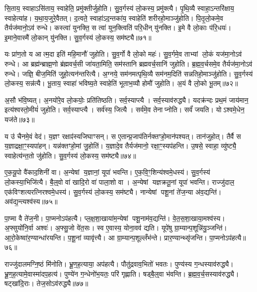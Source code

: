 सि॒ताय॒ स्वाहा\-ऽसि॑ताय॒ स्वाहेति॒ प्रमु॑क्तीर्जुहोति।
सु॒व॒र्गस्य॑ लो॒कस्य॒ प्रमु॑क्त्यै।
पृ॒थि॒व्यै स्वाहा॒\-ऽन्तरि॑क्षाय॒ स्वाहेत्या॑ह।
य॒था॒य॒जुरे॒वैतत्।
द॒त्वते॒ स्वाहा॑\-ऽद॒न्तका॑य॒ स्वाहेति॑ शरीरहो॒माञ्जु॑होति।
पि॒तृ॒लो॒कमे॒व तैर्यज॑मानो॒ऽव॑ रुन्धे।
कस्त्वा॑ युनक्ति॒ स त्वा॑ युन॒क्त्विति॑ परि॒धीन् यु॑नक्ति।
इ॒मे वै लो॒काः प॑रि॒धयः॑।
इ॒माने॒वास्मै॑ लो॒कान् यु॑नक्ति।
सु॒व॒र्गस्य॑ लो॒कस्य॒ सम॑ष्ट्यै॥७१॥

यः प्रा॑ण॒तो य आत्म॒दा इति॑ महि॒मानौ॑ जुहोति।
सु॒व॒र्गो वै लो॒को महः॑।
सु॒व॒र्गमे॒व ताभ्यां लो॒कं यज॑मा॒नोऽव॑ रुन्धे।
आ ब्रह्म॑न्ब्राह्म॒णो ब्र॑ह्मवर्च॒सी जा॑यता॒मिति॒ सम॑स्तानि ब्रह्मवर्च॒सानि॑ जुहोति।
ब्र॒ह्म॒व॒र्चसमे॒व तैर्यज॑मा॒नोऽव॑ रुन्धे।
जज्ञि॒ बीज॒मिति॑ जुहो॒त्यन॑न्तरित्यै।
अ॒ग्नये॒ सम॑नमत्पृथि॒व्यै सम॑नम॒दिति॑ सन्नतिहो॒माञ्जु॑होति।
सु॒व॒र्गस्य॑ लो॒कस्य॒ सन्न॑त्यै।
भू॒ताय॒ स्वाहा॑ भविष्य॒ते स्वाहेति॑ भूताभ॒व्यौ होमौ॑ जुहोति।
अ॒यं वै लो॒को भू॒तम्॥७२॥

अ॒सौ भ॑वि॒ष्यत्।
अ॒नयो॑रे॒व लो॒कयोः॒ प्रति॑तिष्ठति।
सर्व॒स्याप्त्यै।
सर्व॒स्याव॑रुद्ध्यै।
यदक्र॑न्दः प्रथ॒मं जाय॑मान॒ इत्य॑श्वस्तो॒मीयं॑ जुहोति।
सर्व॒स्याप्त्यै।
सर्व॑स्य॒ जित्यै।
सर्व॑मे॒व तेनाप्नोति।
सर्वं॑ जयति।
योऽश्वमे॒धेन॒ यज॑ते॥७३॥

य उ॑ चैनमे॒वं वेद॑।
य॒ज्ञꣳ रक्षाꣴ॑स्यजिघाꣳसन्।
स ए॒तान्प्र॒जाप॑तिर्नक्तꣳहो॒मान॑पश्यत्।
तान॑जुहोत्।
तैर्वै स य॒ज्ञाद्रक्षा॒ꣳ॒स्यपा॑हन्।
यन्न॑क्तꣳहो॒मां जु॒होति॑।
य॒ज्ञादे॒व तैर्यज॑मानो॒ रक्षा॒ꣳ॒स्यप॑हन्ति।
उ॒षसे॒ स्वाहा॒ व्यु॑ष्ट्यै॒ स्वाहेत्य॑न्त॒तो जु॑होति।
सु॒व॒र्गस्य॑ लो॒कस्य॒ सम॑ष्ट्यै॥७४॥\anuvakamend[वै नभाꣳ॑सि॒ सूर्यो॒ ज्योतिः॒ सन्त॑त्यै॒ सम॑ष्ट्यै भू॒तं यज॑ते॒ नव॑ च]

ए॒क॒यू॒पो वै॑काद॒शिनी॑ वा।
अ॒न्येषां य॒ज्ञानां॒ यूपा॑ भवन्ति।
ए॒क॒वि॒ꣳ॒शिन्य॑श्वमे॒धस्य॑।
सु॒व॒र्गस्य॑ लो॒कस्या॒भिजि॑त्यै।
बै॒ल्॒वो वा॑ खादि॒रो वा॑ पाला॒शो वा।
अ॒न्येषां यज्ञक्रतू॒नां यूपा॑ भवन्ति।
राज्जु॑दाल॒ एक॑विꣳशत्यरत्निरश्वमे॒धस्य॑।
सु॒व॒र्गस्य॑ लो॒कस्य॒ सम॑ष्ट्यै।
नान्येषां पशू॒नां ते॑ज॒न्या अ॑व॒द्यन्ति॑।
अव॑द्य॒न्त्यश्व॑स्य॥७५॥

पा॒प्मा वै ते॑ज॒नी।
पा॒प्मनो\-ऽप॑हत्यै।
प्ल॒क्ष॒शा॒खाया॑म॒न्येषां पशू॒नाम॑व॒द्यन्ति॑।
वे॒त॒स॒शा॒खाया॒मश्व॑स्य।
अ॒फ्सुयो॑नि॒र्वा अश्वः॑।
अ॒फ्सु॒जो वे॑त॒सः।
स्व ए॒वास्य॒ योना॒वव॑ द्यति।
यूपे॑षु ग्रा॒म्यान्प॒शून्नि॑यु॒ञ्जन्ति॑।
आ॒रो॒केष्वा॑र॒ण्यान्धा॑रयन्ति।
प॒शू॒नां व्यावृ॑त्त्यै।
आ ग्रा॒म्यान्प॒शूल्लँभ॑न्ते।
प्रार॒ण्यान्थ्सृ॑जन्ति।
पा॒प्मनो\-ऽप॑हत्यै॥७६॥\anuvakamend[अश्व॑स्य॒ व्यावृ॑त्त्यै॒ त्रीणि॑ च]

राज्जु॑दालमग्नि॒ष्ठं मि॑नोति।
भ्रू॒ण॒ह॒त्याया॒ अप॑हत्यै।
पौतु॑द्रवाव॒भितो॑ भवतः।
पुण्य॑स्य ग॒न्धस्याव॑रुद्ध्यै।
भ्रू॒ण॒ह॒त्यामे॒वास्मा॑दप॒हत्य॑।
पुण्ये॑न ग॒न्धेनो॑भ॒यतः॒ परि॑ गृह्णाति।
षड्बै॒ल्॒वा भ॑वन्ति।
ब्र॒ह्म॒व॒र्च॒सस्याव॑रुद्ध्यै।
षट्खा॑दि॒राः।
तेज॒सो\-ऽव॑रुद्ध्यै॥७७॥


